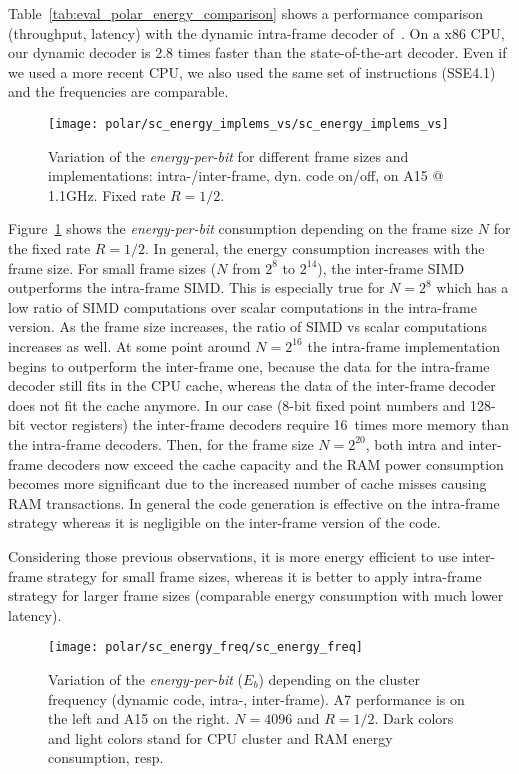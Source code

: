 Table~\ref{tab:eval_polar_energy_comparison} shows a performance comparison
(throughput, latency) with the dynamic intra-frame decoder of~\cite{Giard2014}.
On a x86 CPU, our dynamic decoder is 2.8 times faster than the state-of-the-art
decoder. Even if we used a more recent CPU, we also used the same set of
instructions (SSE4.1) and the frequencies are comparable.

\begin{figure}[htp]
  \centering
  \texttt{[image: polar/sc\_energy\_implems\_vs/sc\_energy\_implems\_vs]}
  \caption{Variation of the \emph{energy-per-bit} for different frame sizes and
    implementations: intra-/inter-frame, dyn. code on/off, on A15 @ 1.1GHz.
    Fixed rate $R = 1/2$.}
  \label{plot:eval_polar_sc_energy_implems_vs}
\end{figure}

Figure~\ref{plot:eval_polar_sc_energy_implems_vs} shows the
\emph{energy-per-bit} consumption depending on the frame size $N$ for the fixed
rate $R = 1/2$. In general, the energy consumption increases with the frame
size. For small frame sizes ($N$ from $2^{8}$ to $2^{14}$), the inter-frame SIMD
outperforms the intra-frame SIMD. This is especially true for $N = 2^8$ which
has a low ratio of SIMD computations over scalar computations in the intra-frame
version. As the frame size increases, the ratio of SIMD vs scalar computations
increases as well. At some point around $N = 2^{16}$ the intra-frame
implementation begins to outperform the inter-frame one, because the data for
the intra-frame decoder still fits in the CPU cache, whereas the data of the
inter-frame decoder does not fit the cache anymore. In our case (8-bit fixed
point numbers and 128-bit vector registers) the inter-frame decoders require
16~times more memory than the intra-frame decoders. Then, for the frame size
$N = 2^{20}$, both intra and inter-frame decoders now exceed the cache capacity
and the RAM power consumption becomes more significant due to the increased
number of cache misses causing RAM transactions. In general the code generation
is effective on the intra-frame strategy whereas it is negligible on the
inter-frame version of the code.

Considering those previous observations, it is more energy efficient to use
inter-frame strategy for small frame sizes, whereas it is better to apply
intra-frame strategy for larger frame sizes (comparable energy consumption with
much lower latency).

\begin{figure}[htp]
  \centering
  \texttt{[image: polar/sc\_energy\_freq/sc\_energy\_freq]}
  \caption{Variation of the \emph{energy-per-bit} ($E_b$) depending on the
    cluster frequency (dynamic code, intra-, inter-frame).
    A7 performance is on the left and A15 on the right. $N = 4096$ and $R = 1/2$.
    Dark colors and light colors stand for CPU cluster and RAM energy consumption,
    resp.}
  \label{plot:eval_polar_sc_energy_freq}
\end{figure}

